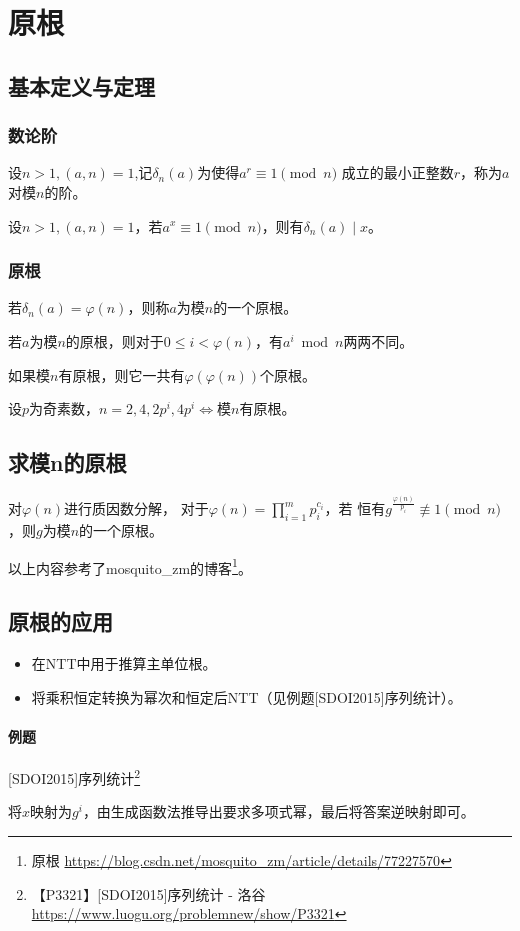 \section{原根}\label{PrimitiveRoot}
\subsection{基本定义与定理}
\subsubsection{数论阶}
设$n>1,(a,n)=1$,记$\delta_n(a)$为使得$a^r\equiv 1 \pmod{n}$
成立的最小正整数$r$，称为$a$对模$n$的阶。

\begin{theorem}
	设$n>1,(a,n)=1$，若$a^x\equiv 1 \pmod{n}$，则有$\delta_n(a)\mid x$。
\end{theorem}

\subsubsection{原根}
若$\delta_n(a)=\varphi(n)$，则称$a$为模$n$的一个原根。

若$a$为模$n$的原根，则对于$0\leq i< \varphi(n)$，有$a^i\bmod{n}$两两不同。

\begin{theorem}
	如果模$n$有原根，则它一共有$\varphi(\varphi(n))$个原根。
\end{theorem}

\begin{theorem}
	设$p$为奇素数，$n=2,4,2p^i,4p^i\Leftrightarrow$模$n$有原根。
\end{theorem}

\subsection{求模n的原根}

对$\varphi(n)$进行质因数分解，
对于$\displaystyle \varphi(n)=\prod_{i=1}^m{p_i^{c_i}}$，若
恒有$g^\frac{\varphi(n)}{p_i}\not\equiv 1 \pmod{n}$，则$g$为模$n$的一个原根。

以上内容参考了mosquito\_zm的博客\footnote{原根
	\url{https://blog.csdn.net/mosquito\_zm/article/details/77227570}}。
\subsection{原根的应用}
\begin{itemize}
	\item 在NTT中用于推算主单位根。
	\item 将乘积恒定转换为幂次和恒定后NTT（见例题[SDOI2015]序列统计）。
\end{itemize}
\paragraph{例题} [SDOI2015]序列统计\footnote{【P3321】[SDOI2015]序列统计 - 洛谷
\url{https://www.luogu.org/problemnew/show/P3321}}

将$x$映射为$g^i$，由生成函数法推导出要求多项式幂，最后将答案逆映射即可。


